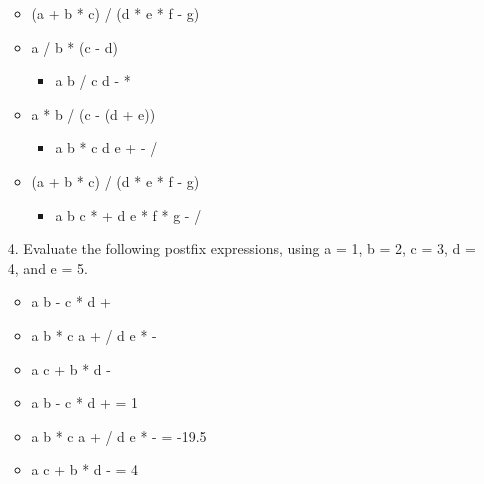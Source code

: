 \documentclass[10pt]{article}
\begin{document}
\begin{enumerate}
\begin{itemize}
				\item (a + b * c) / (d * e * f - g)
			\end{itemize}
			
			\vspace{0.5cm}
			\begin{itemize}
				\item a / b * (c - d)
					
					\begin{itemize}
						\item a b / c d - *
					\end{itemize}
				
				\item a * b / (c - (d + e))
					
					\begin{itemize}
						\item a b * c d e + - /
					\end{itemize}
				
				\item (a + b * c) / (d * e * f - g)
					
					\begin{itemize}
						\item a b c * + d e * f * g - /
					\end{itemize}
			\end{itemize}
			\vspace{0.5cm}
		
		\item[4.] Evaluate the following postfix expressions, using a = 1, b = 2, c = 3, d = 4, and e = 5.
			
			\begin{itemize}
				\item a b - c * d +
				
				\item a b * c a + / d e * -
				
				\item a c + b * d -
			\end{itemize}
			
			\vspace{0.5cm}
			\begin{itemize}
				\item a b - c * d + = 1
				
				\item a b * c a + / d e * - = -19.5
				
				\item a c + b * d - = 4
			\end{itemize}
			\vspace{0.5cm}
		

\end{enumerate}
\end{document}
